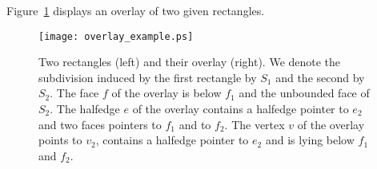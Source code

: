 Figure~\ref{OVL_sec:overlay_example} displays an overlay of two given rectangles.

\begin{figure}[h]
    \begin{ccTexOnly}
        \centerline{
           \texttt{[image: overlay\_example.ps]}
           }
    \end{ccTexOnly}
    \caption{Two rectangles (left) and their overlay (right). We denote the subdivision 
       induced by the first rectangle by $S_1$ and the second by $S_2$. 
       The face $f$ of the overlay is below $f_1$ and the unbounded face of $S_2$. 
       The halfedge $e$ of the overlay contains a halfedge pointer to $e_2$ 
       and two faces pointers to $f_1$ and to $f_2$. 
       The vertex $v$ of the overlay points to $v_2$, contains a halfedge 
       pointer to $e_2$ and is lying below $f_1$ and $f_2$.}
    \label{OVL_sec:overlay_example}
\end{figure}

